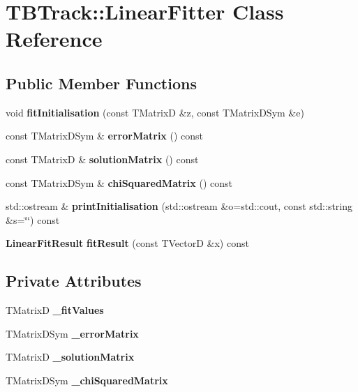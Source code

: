\section{T\-B\-Track\-:\-:Linear\-Fitter Class Reference}
\label{classTBTrack_1_1LinearFitter}
\subsection*{Public Member Functions}
\begin{DoxyCompactItemize}
\item 
void {\bfseries fit\-Initialisation} (const T\-Matrix\-D \&z, const T\-Matrix\-D\-Sym \&e)\label{classTBTrack_1_1LinearFitter_af83e617778ace54723fba9d11eaad900}

\item 
const T\-Matrix\-D\-Sym \& {\bfseries error\-Matrix} () const \label{classTBTrack_1_1LinearFitter_ab3c00a9eb140ba63e0cae20e7db9df43}

\item 
const T\-Matrix\-D \& {\bfseries solution\-Matrix} () const \label{classTBTrack_1_1LinearFitter_adb053f46cd4b1cabd89aafb802b14b4e}

\item 
const T\-Matrix\-D\-Sym \& {\bfseries chi\-Squared\-Matrix} () const \label{classTBTrack_1_1LinearFitter_a941c09f4b9d2976aa9b14ac1c9d55ccd}

\item 
std\-::ostream \& {\bfseries print\-Initialisation} (std\-::ostream \&o=std\-::cout, const std\-::string \&s=\char`\"{}\char`\"{}) const \label{classTBTrack_1_1LinearFitter_a458de2b57f0b458e007fab1eb04a3b71}

\item 
{\bf Linear\-Fit\-Result} {\bfseries fit\-Result} (const T\-Vector\-D \&x) const \label{classTBTrack_1_1LinearFitter_a3609570379fc6b194cd8a576d5579be6}

\end{DoxyCompactItemize}
\subsection*{Private Attributes}
\begin{DoxyCompactItemize}
\item 
T\-Matrix\-D {\bfseries \-\_\-fit\-Values}\label{classTBTrack_1_1LinearFitter_a0d5ab614c1263e593037ebdd7fccf92d}

\item 
T\-Matrix\-D\-Sym {\bfseries \-\_\-error\-Matrix}\label{classTBTrack_1_1LinearFitter_a92f10ab1b7cc02975e9c84823e93af18}

\item 
T\-Matrix\-D {\bfseries \-\_\-solution\-Matrix}\label{classTBTrack_1_1LinearFitter_af166aa8136a2aa0f60f47fa2e984f2cd}

\item 
T\-Matrix\-D\-Sym {\bfseries \-\_\-chi\-Squared\-Matrix}\label{classTBTrack_1_1LinearFitter_a86f7868c45931d0cc11e150bb81761c4}

\end{DoxyCompactItemize}


